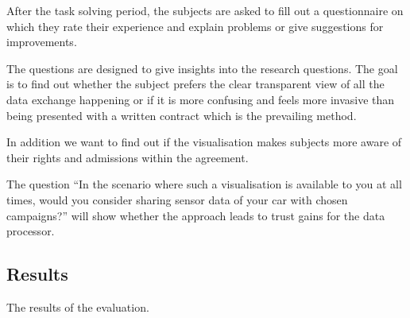 \documentclass[../paper.tex]{subfiles}
\begin{document}
  After the task solving period, the subjects are asked to fill out a
  questionnaire on which they rate their experience and explain problems or
  give suggestions for improvements.

  The questions are designed to give insights into the research questions. The
  goal is to find out whether the subject prefers the clear transparent view of
  all the data exchange happening or if it is more confusing and feels more
  invasive than being presented with a written contract which is the prevailing
  method.

  In addition we want to find out if the visualisation makes subjects more
  aware of their rights and admissions within the agreement.

  The question “In the scenario where such a visualisation is available to you
  at all times, would you consider sharing sensor data of your car with chosen
  campaigns?” will show whether the approach leads to trust gains for the data
  processor.

  \subsection{Results}

  The results of the evaluation.
\end{document}
